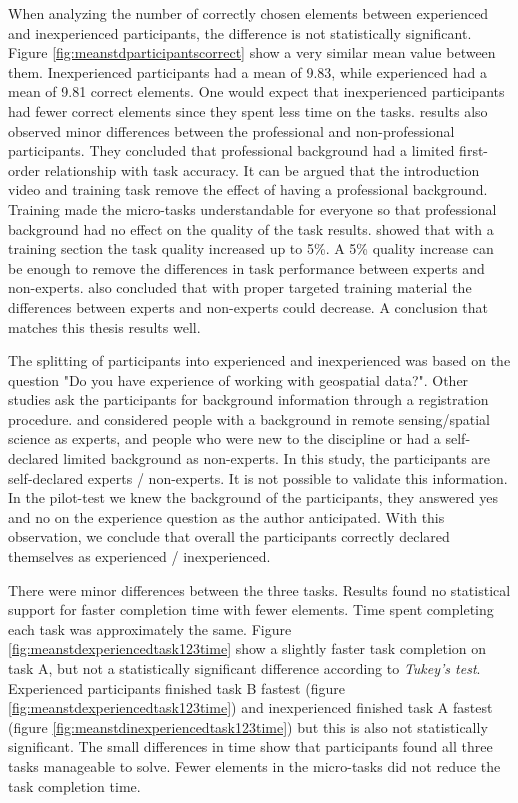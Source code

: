 When analyzing the number of correctly chosen elements between experienced and inexperienced participants, the difference is not statistically significant. Figure \ref{fig:meanstdparticipantscorrect} show a very similar mean value between them. Inexperienced participants had a mean of 9.83, while experienced had a mean of 9.81 correct elements. One would expect that inexperienced participants had fewer correct elements since they spent less time on the tasks. \cite{Salk2016} results also observed minor differences between the professional and non-professional participants. They concluded that professional background had a limited first-order relationship with task accuracy. It can be argued that the introduction video and training task remove the effect of having a professional background. Training made the micro-tasks understandable for everyone so that professional background had no effect on the quality of the task results. \cite{Gadiraju2015a} showed that with a training section the task quality increased up to 5\%. A 5\% quality increase can be enough to remove the differences in task performance between experts and non-experts. \cite{See2013} also concluded that with proper targeted training material the differences between experts and non-experts could decrease. A conclusion that matches this thesis results well. 

The splitting of participants into experienced and inexperienced was based on the question "Do you have experience of working with geospatial data?". Other studies ask the participants for background information through a registration procedure. \cite{See2013} and \cite{Salk2016} considered people with a background in remote sensing/spatial science as experts, and people who were new to the discipline or had a self-declared limited background as non-experts. In this study, the participants are self-declared experts / non-experts. It is not possible to validate this information. In the pilot-test we knew the background of the participants, they answered yes and no on the experience question as the author anticipated. With this observation, we conclude that overall the participants correctly declared themselves as experienced / inexperienced.

There were minor differences between the three tasks. Results found no statistical support for faster completion time with fewer elements. Time spent completing each task was approximately the same. Figure \ref{fig:meanstdexperiencedtask123time} show a slightly faster task completion on task A, but not a statistically significant difference according to \textit{Tukey's test}. Experienced participants finished task B fastest (figure \ref{fig:meanstdexperiencedtask123time}) and inexperienced finished task A fastest (figure \ref{fig:meanstdinexperiencedtask123time}) but this is also not statistically significant. The small differences in time show that participants found all three tasks manageable to solve. Fewer elements in the micro-tasks did not reduce the task completion time.

